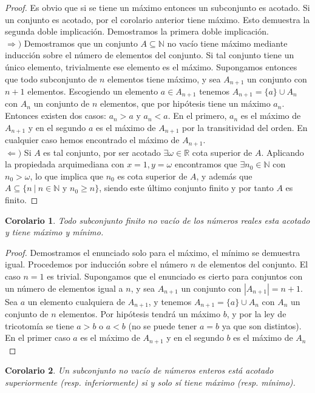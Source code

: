 \documentclass{article}
\newtheorem{cor}{Corolario}
\newcommand{\reales}{\mathbb{R}}
\newcommand{\naturales}{\mathbb{N}}
\begin{document}
\begin{proof} 
	Es obvio que si se tiene un máximo entonces un subconjunto es acotado. Si un conjunto es acotado, por el corolario anterior tiene máximo. Esto demuestra la segunda doble implicación. Demostramos la primera doble implicación.\\ 
	$\Rightarrow)$ Demostramos que un conjunto $A \subseteq \naturales$ no vacío tiene máximo mediante inducción sobre el número de elementos del conjunto. Si tal conjunto tiene un único elemento, trivialmente ese elemento es el máximo. Supongamos entonces que todo subconjunto de $n$ elementos tiene máximo, y sea $A_{n+1}$ un conjunto con $n+1$ elementos. Escogiendo un elemento $a \in A_{n+1}$ tenemos $A_{n+1} = \{a \} \cup A_{n}$ con $A_{n}$ un conjunto de $n$ elementos, que por hipótesis tiene un máximo $a_n$. Entonces existen dos casos: $a_n > a$ y $a_n < a$. En el primero, $a_n$ es el máximo de $A_{n+1}$ y en el segundo $a$ es el máximo de $A_{n+1}$ por la transitividad del orden. En cualquier caso hemos encontrado el máximo de $A_{n+1}$.\\ 
	$\Leftarrow)$ Si $A$ es tal conjunto, por ser acotado $\exists \omega \in \reales$ cota superior de $A$. Aplicando la propiedada arquimediana con $x = 1, y = \omega$ encontramos que $\exists n_0 \in \naturales$ con $n_0 > \omega$, lo que implica que $n_0$ es cota superior de $A$, y además que $A \subseteq \{n\ |\ n\in\naturales \text{ y } n_0 \geq n \}$, siendo este último conjunto finito y por tanto $A$ es finito.
\end{proof}
\begin{cor}
	Todo subconjunto finito no vacío de los números reales esta acotado y tiene máximo y mínimo.
\end{cor}
\begin{proof}
	Demostramos el enunciado solo para el máximo, el mínimo se demuestra igual. Procedemos por inducción sobre el número $n$ de elementos del conjunto. El caso $n = 1$ es trivial. Supongamos que el enunciado es cierto para conjuntos con un número de elementos igual a $n$, y sea $A_{n+1}$ un conjunto con $|A_{n+1}| = n+1$. Sea $a$ un elemento cualquiera de $A_{n+1}$, y tenemos $A_{n+1} = \{a\} \cup A_{n}$ con $A_n$ un conjunto de $n$ elementos. Por hipótesis tendrá un máximo $b$, y por la ley de tricotomía  se tiene $a > b$ o $a < b$ (no se puede tener $a = b$ ya que son distintos). En el primer caso $a$ es el máximo de $A_{n+1}$ y en el segundo $b$ es el máximo de $A_n$
\end{proof}
\begin{cor}
	Un subconjunto no vacío de números enteros está acotado superiormente (resp. inferiormente) si y solo sí tiene máximo (resp. mínimo).
\end{cor}
\end{document}
